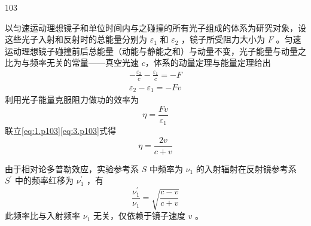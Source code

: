 \begin{solution}{103}
    \begin{subsolution}
        以匀速运动理想镜子和单位时间内与之碰撞的所有光子组成的体系为研究对象，设这些光子入射和反射时的总能量分别为 $\varepsilon_{1}$ 和 $\varepsilon_{2}$ ，镜子所受阻力大小为 $F$ 。匀速运动理想镜子碰撞前后总能量（动能与静能之和）与动量不变，光子能量与动量之比为与频率无关的常量——真空光速 $c$，体系的动量定理与能量定理给出
        \begin{align}
            - \frac {\varepsilon_ {2}}{c} - \frac {\varepsilon_ {1}}{c} = - F \\
            \varepsilon_ {2} - \varepsilon_ {1} = - F v
            \label{eq:1.p103}
        \end{align}
        利用光子能量克服阻力做功的效率为
        \begin{equation}
            \eta = \frac {F v}{\varepsilon_ {1}}
            \label{eq:3.p103}
        \end{equation}
        联立\eqref{eq:1.p103}\eqref{eq:3.p103}式得
        \begin{equation}
            \eta = \frac {2 v}{c + v}
            \label{eq:4.p103}
        \end{equation}
    \end{subsolution}
    \begin{subsolution}
        由于相对论多普勒效应，实验参考系 $S$ 中频率为 $\nu_{1}$ 的入射辐射在反射镜参考系 $S^{\prime}$ 中的频率红移为 $\nu_{1}^{\prime}$ ，有
        \begin{equation}
            \frac {\nu_ {1} ^ {\prime}}{\nu_ {1}} = \sqrt {\frac {c - v}{c + v}}
            \label{eq:5.p103}
        \end{equation}
        此频率比与入射频率 $\nu_{1}$ 无关，仅依赖于镜子速度 $v$ 。


\end{subsolution}
\end{solution}
